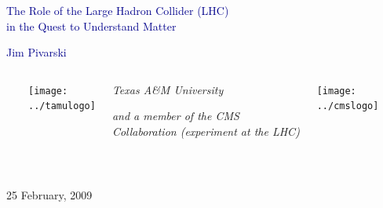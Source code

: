 \documentclass[compress]{beamer}
\begin{document}
\begin{frame}
\vfill
\begin{center}
\textcolor{darkblue}{\Large The Role of the Large Hadron Collider (LHC) \\ \vspace{0.2 cm} in the Quest to Understand Matter}

\vfill
\begin{center}
\large
\textcolor{darkblue}{Jim Pivarski}
\end{center}

\begin{columns}
\mbox{ }

\texttt{[image: ../tamulogo]}

\begin{center}
\begin{minipage}{0.75\linewidth}
\begin{center}
\scriptsize {\it Texas A\&M University}

\vspace{0.2 cm}
{\it and a member of the CMS Collaboration (experiment at the LHC)}

\mbox{ }
\end{center}
\end{minipage}
\end{center}

\texttt{[image: ../cmslogo]}

\mbox{ }
\end{columns}

\vfill
25 February, 2009

\end{center}
\end{frame}

\small
\end{document}
